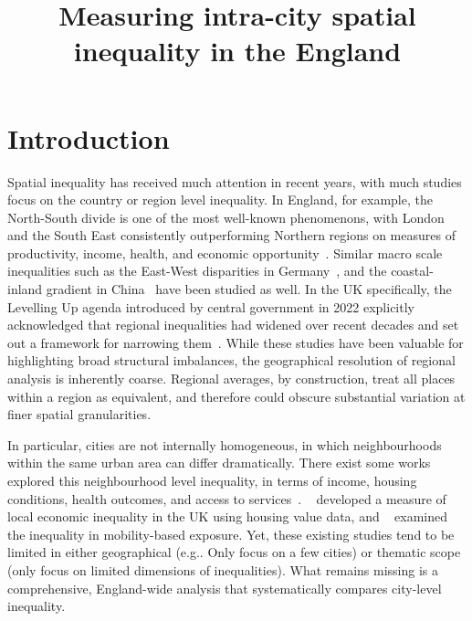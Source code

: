 \documentclass[11pt,journal,compsoc]{IEEEtran}
\begin{document}
\title{Measuring intra-city spatial inequality in the England}

\maketitle
\section{Introduction}

Spatial inequality has received much attention in recent years, with much studies focus on the country or region level inequality. In England, for example, the North-South divide is one of the most well-known phenomenons, with London and the South East consistently outperforming Northern regions on measures of productivity, income, health, and economic opportunity~\cite{martin2016spatially,bambra2018health,carneiro2025not}. Similar macro scale inequalities such as the East-West disparities in Germany~\cite{iammarino2019regional}, and the coastal-inland gradient in China~\cite{wei2009beyond} have been studied as well. In the UK specifically, the Levelling Up agenda introduced by central government in 2022 explicitly acknowledged that regional inequalities had widened over recent decades and set out a framework for narrowing them~\cite{ukgovernment2022levelling,mccann2024levelling}. While these studies have been valuable for highlighting broad structural imbalances, the geographical resolution of regional analysis is inherently coarse. Regional averages, by construction, treat all places within a region as equivalent, and therefore could obscure substantial variation at finer spatial granularities.


In particular, cities are not internally homogeneous, in which neighbourhoods within the same urban area can differ dramatically. There exist some works explored this neighbourhood level inequality, in terms of income, housing conditions, health outcomes, and access to services~\cite{sarkar2024spatial,tammaru2014socio}. \citeauthor{suss2023measuring}~\cite{suss2023measuring} developed a measure of local economic inequality in the UK using housing value data, and \citeauthor{gao2024unpacking}~\cite{gao2024unpacking} examined the inequality in mobility-based exposure. Yet, these existing studies tend to be limited in either geographical (e.g.. Only focus on a few cities) or thematic scope (only focus on limited dimensions of inequalities). What remains missing is a comprehensive, England-wide analysis that systematically compares city-level inequality.
\end{document}
